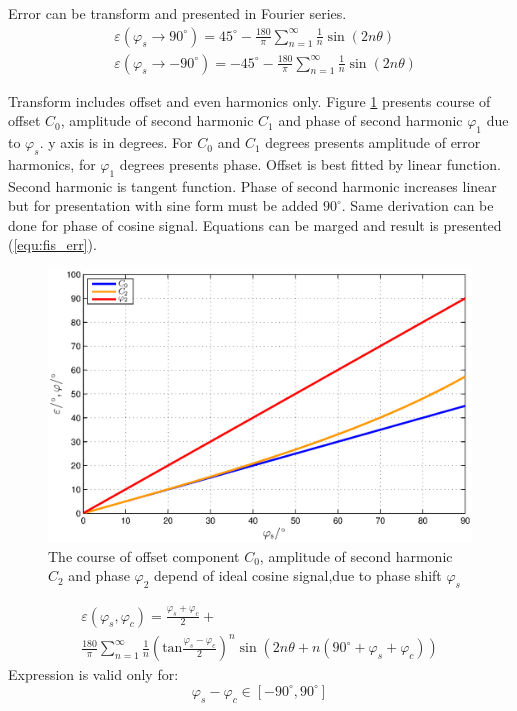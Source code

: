 \documentclass[a4paper]{article}
\begin{document}
Error can be transform and presented in Fourier series.
\begin{eqnarray}
\label{equ:lim_fis_vrsta}
&\varepsilon(\varphi_{s} \rightarrow 90^\circ) = 45^\circ - \frac{180}{\pi}\sum_{n=1}^{\infty}\frac{1}{n} \sin (2n \theta)\\
&\varepsilon(\varphi_{s} \rightarrow -90^\circ) = -45^\circ - \frac{180}{\pi}\sum_{n=1}^{\infty}\frac{1}{n} \sin (2n \theta)
\end{eqnarray}

Transform includes offset and even harmonics only. Figure  \ref{fig:fis} presents course of offset $C_0$, amplitude of second harmonic $C_1$ and phase    of second harmonic $\varphi_{1}$ due to $\varphi_s$. y axis is in degrees. For $C_0$ and $C_1$ degrees presents amplitude of error harmonics, for $\varphi_{1}$ degrees presents phase. Offset is best fitted by linear function. Second harmonic is tangent function. Phase of second harmonic increases linear but for presentation with sine form must be added $90^\circ$. Same derivation can be done for phase of cosine signal. Equations can be marged and result is presented (\ref{equ:fis_err}).
\begin{figure}[!htb]
	\begin{center}
		\includegraphics[width=\linewidth]{./Slike/fis.eps}
		\caption{The course of offset component $C_0$, amplitude of second harmonic  $C_2$ and phase $\varphi_2$ depend of ideal cosine signal,due to phase shift $\varphi_{s}$} \label{fig:fis}
	\end{center}
\end{figure}
\begin{multline}
\label{equ:fis_err}
\varepsilon(\varphi_{s},\varphi_{c}) = \frac{\varphi_{s}+\varphi_{c}}{2}+\\ \frac{180}{\pi}\sum_{n=1}^{\infty}\frac{1}{n} (\mathrm{tan}\frac{\varphi_{s}-\varphi_{c}}{2})^n \sin (2n \theta+n(90^\circ +\varphi_{s}+\varphi_{c}))
\end{multline}
Expression is valid only for:
$$ \varphi_{s}-\varphi_{c} \in [ -90^\circ , 90^\circ ] $$
\end{document}
